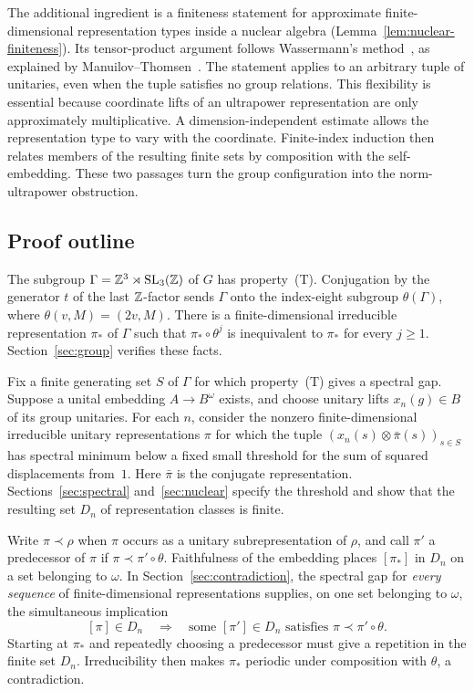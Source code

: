 The additional ingredient is a finiteness statement for approximate
finite-dimensional representation types inside a nuclear algebra
(Lemma~\ref{lem:nuclear-finiteness}). Its tensor-product argument follows
Wassermann's method~\cite{Wassermann1991}, as explained
by Manuilov--Thomsen~\cite[Section~2.1]{ManuilovThomsen2007}.
The statement applies to an arbitrary tuple of unitaries, even when the
tuple satisfies no group relations. This flexibility is essential because
coordinate lifts of an ultrapower representation are only approximately
multiplicative. A dimension-independent estimate allows the representation
type to vary with the coordinate. Finite-index induction then relates
members of the resulting finite sets by composition with the self-embedding.
These two passages turn the group configuration into the norm-ultrapower
obstruction.

\subsection{Proof outline}

The subgroup $\Gamma=\mathbb Z^3\rtimes\operatorname{SL}_3(\mathbb Z)$ of $G$ has property~(T).
Conjugation by the generator $t$ of the last $\mathbb Z$-factor sends $\Gamma$
onto the index-eight subgroup
$\theta(\Gamma)$, where $\theta(v,M)=(2v,M)$.
There is a finite-dimensional irreducible representation $\pi_*$ of
$\Gamma$ such that $\pi_*\circ\theta^j$ is inequivalent to $\pi_*$ for
every $j\ge1$. Section~\ref{sec:group} verifies these facts.

Fix a finite generating set $S$ of $\Gamma$ for which property~(T)
gives a spectral gap. Suppose a unital embedding $A\to B^\omega$ exists,
and choose unitary lifts $x_n(g)\in B$ of its group unitaries. For each
$n$, consider the nonzero finite-dimensional irreducible unitary representations
$\pi$ for which the tuple $(x_n(s)\otimes\bar\pi(s))_{s\in S}$ has
spectral minimum below a fixed small threshold for the sum of squared
displacements from~$1$. Here $\bar\pi$ is the conjugate representation.
Sections~\ref{sec:spectral} and~\ref{sec:nuclear} specify the threshold
and show that the resulting set $D_n$ of representation classes is finite.

Write $\pi\prec\rho$ when $\pi$ occurs as a unitary subrepresentation
of $\rho$, and call $\pi'$ a predecessor of $\pi$ if
$\pi\prec\pi'\circ\theta$. Faithfulness of the embedding places
$[\pi_*]$ in $D_n$ on a set belonging to $\omega$.
In Section~\ref{sec:contradiction}, the spectral gap for
\emph{every sequence} of finite-dimensional representations supplies,
on one set belonging to $\omega$, the simultaneous implication
\[
 [\pi]\in D_n\quad\Longrightarrow\quad
 \text{some }[\pi']\in D_n\text{ satisfies }\pi\prec\pi'\circ\theta.
\]
Starting at $\pi_*$ and repeatedly choosing a predecessor must give a
repetition in the finite set $D_n$. Irreducibility then makes $\pi_*$
periodic under composition with $\theta$, a contradiction.
